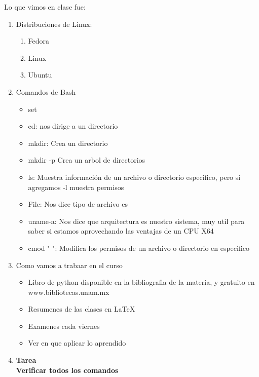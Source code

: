 \documentclass[letterpaper, 12pt, oneside]{article}%
\begin{document}
Lo que vimos en clase fue:%
\begin{enumerate}%
	\item Distribuciones de Linux: %
	\begin{enumerate}%
		\item Fedora
		\item Linux
		\item Ubuntu
	\end{enumerate}%
	\item Comandos de Bash%
	\begin{itemize}%
		\item set
		\item cd: nos dirige a un directorio
		\item mkdir: Crea un directorio
		\item mkdir -p Crea un arbol de directorios
		\item ls: Muestra información de un archivo o directorio especifico, pero si agregamos -l muestra permisos
		\item File: Nos dice tipo de archivo es
		\item uname-a: Nos dice que arquitectura es nuestro sistema, muy util para saber si estamos aprovechando las ventajas de un CPU X64
		\item cmod "   ": Modifica los permisos de un archivo o directorio en especifico
				
	\end{itemize}%
	\item Como vamos a trabaar en el curso
		\begin{itemize}
			\item Libro de python disponible en la bibliografia de la materia, y gratuito en www.bibliotecas.unam.mx
			\item Resumenes de las clases en LaTeX
			\item Examenes cada viernes
			\item Ver en que aplicar lo aprendido
		\end{itemize}
	\item \textbf{Tarea}
	\\
	\textbf{Verificar todos los comandos}
	
	
	
\end{enumerate}%
	
\end{document}
